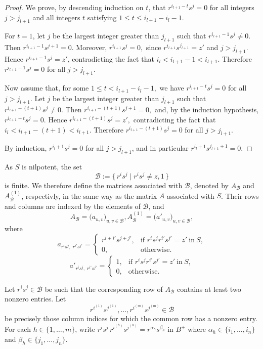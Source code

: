 \documentclass[11pt,reqno]{amsart}
\theoremstyle{plain}
\theoremstyle{remark}
\theoremstyle{definition}
\begin{document}
\begin{proof}
We prove, by descending induction on $t$, that
\(r^{i_{l+1}-t}s^j=0\)
for all integers $j>j_{l+1}$ and all integers $t$ satisfying
\(1\leq t\leq i_{l+1}-i_l-1\).

For $t=1$, let $j$ be the largest integer greater than $j_{l+1}$ such that
\(r^{i_{l+1}-1}s^j\neq 0\).
Then
\(r^{i_{l+1}-1}s^{j+1}=0\).
Moreover,
\(r^{i_{l+1}}s^j=0,\)
since $r^{i_{l+1}}s^{j_{l+1}}=z'$ and $j>j_{l+1}$.
Hence \(r^{i_{l+1}-1}s^j=z'\),
contradicting the fact that
\(i_l<i_{l+1}-1<i_{l+1}\).
Therefore
\(r^{i_{l+1}-1}s^j=0\)
for all $j>j_{l+1}$.

Now assume that, for some
\(1\leq t<i_{l+1}-i_l-1,\)
we have
\(r^{i_{l+1}-t}s^j=0\)
for all $j>j_{l+1}$.
Let $j$ be the largest integer greater than $j_{l+1}$ such that
\(r^{i_{l+1}-(t+1)}s^j\neq 0.\)
Then
\(r^{i_{l+1}-(t+1)}s^{j+1}=0,\)
and, by the induction hypothesis,
\(r^{i_{l+1}-t}s^j=0.\)
Hence
\(r^{i_{l+1}-(t+1)}s^j=z',\)
contradicting the fact that
\(i_l<i_{l+1}-(t+1)<i_{l+1}.\)
Therefore
\(r^{i_{l+1}-(t+1)}s^j=0\)
for all $j>j_{l+1}$.

By induction,
\(r^{i_l+1}s^j=0\)
for all $j>j_{l+1}$, and in particular
\(r^{i_l+1}s^{j_{l+1}+1}=0.\)
\end{proof}

As $S$ is nilpotent, the set
\[
\mathcal{B}:=\{\,r^is^j \mid r^is^j\neq z,1\,\}
\]
is finite. We therefore define the matrices associated with $\mathcal{B}$, denoted by $A_{\mathcal{B}}$ and $A^{(1)}_{\mathcal{B}}$, respectivly, in the same way as the matrix $A$ associated with $S$. Their rows and columns are indexed by the elements of $\mathcal{B}$, and
\[
A_{\mathcal{B}}=\bigl(a_{u,v}\bigr)_{u,v\in\mathcal{B}}, A^{(1)}_{\mathcal{B}}=\bigl(a'_{u,v}\bigr)_{u,v\in\mathcal{B}},
\]
where
\[
a_{r^is^j,\;r^{i'}s^{j'}}
=
\begin{cases}
r^{i+i'}s^{j+j'}, & \text{if } r^is^jr^{i'}s^{j'}=z'\ \text{in}\ S,\\[1mm]
0, & \text{otherwise}.
\end{cases}
\]
\[
a'_{r^is^j,\;r^{i'}s^{j'}}
=
\begin{cases}
1, & \text{if } r^is^jr^{i'}s^{j'}=z'\ \text{in}\ S,\\[1mm]
0, & \text{otherwise}.
\end{cases}
\]


Let $r^is^j\in\mathcal{B}$ be such that the corresponding row of $A_{\mathcal{B}}$ contains at least two nonzero entries.
Let
\[
r^{i^{(1)}}s^{j^{(1)}},\ldots,r^{i^{(m)}}s^{j^{(m)}}\in\mathcal{B}
\]
be precisely those column indices for which the common row has a nonzero entry. For each $h\in\{1,\ldots,m\}$, write
\(
r^is^j\,r^{i^{(h)}}s^{j^{(h)}}=r^{\alpha_h}s^{\beta_h}\) in $B^+$
where
\(
\alpha_h\in\{i_1,\ldots,i_n\}\) and \(\beta_h\in\{j_1,\ldots,j_n\}\).
\end{document}

